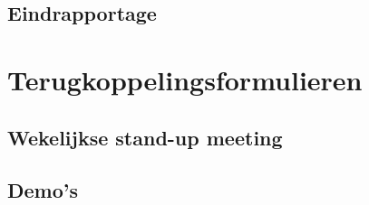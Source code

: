 \documentclass[a4paper]{article}
\begin{document}
    \subsection{Eindrapportage}
    

  \section{Terugkoppelingsformulieren}
    \subsection{Wekelijkse stand-up meeting}
    
    \subsection{Demo's}
    
\end{document}
